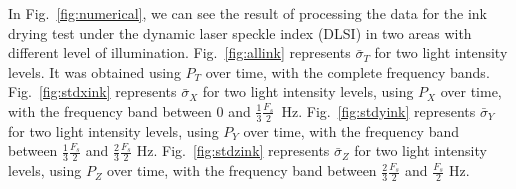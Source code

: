 \documentclass[review]{elsarticle}
\begin{document}
In Fig.~\ref{fig:numerical}, we can see the result of processing 
 the data for the ink drying test under the dynamic laser speckle index (DLSI) in two areas with 
different level of illumination. Fig.~\ref{fig:allink}
represents $\bar{\sigma}_T$ for two light intensity levels. It was obtained using $P_T$
over time, with the complete frequency bands.
Fig.~\ref{fig:stdxink}
represents $\bar{\sigma}_X$ for two light intensity levels, using $P_X$
over time, with the frequency band between $0$ and $\frac{1}{3}\frac{F_s}{2}$\ Hz.
Fig.~\ref{fig:stdyink}
represents $\bar{\sigma}_Y$ for two light intensity levels, using $P_Y$
over time, with the frequency band between $\frac{1}{3}\frac{F_s}{2}$ and $\frac{2}{3}\frac{F_s}{2}$ Hz.
Fig.~\ref{fig:stdzink}
represents $\bar{\sigma}_Z$ for two light intensity levels, using $P_Z$
over time, with the frequency band between $\frac{2}{3}\frac{F_s}{2}$ and $\frac{F_s}{2}$ Hz.
\end{document}
